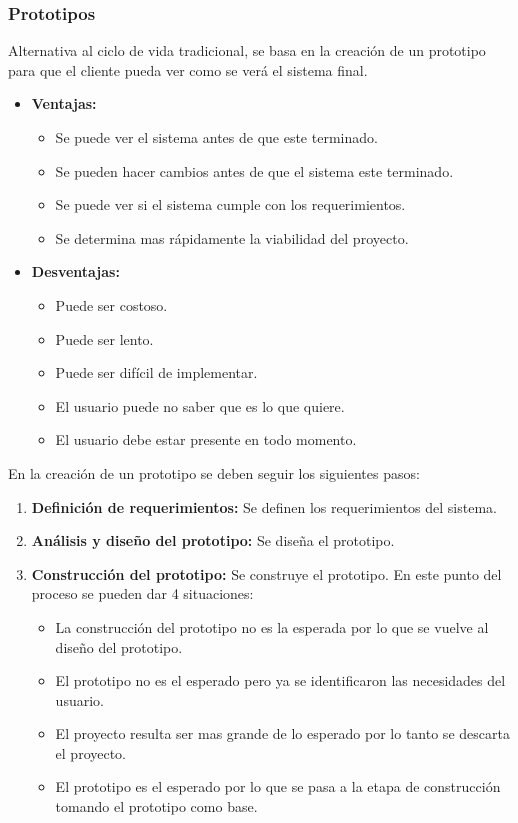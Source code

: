 \documentclass{templateNote}
\begin{document}
\subsubsection{Prototipos}
\noindent Alternativa al ciclo de vida tradicional, se basa en la creación de un prototipo para que el cliente pueda ver como se verá el sistema final.
\begin{itemize}
    \item \textbf{Ventajas:}
    \begin{itemize}
        \item Se puede ver el sistema antes de que este terminado.
        \item Se pueden hacer cambios antes de que el sistema este terminado.
        \item Se puede ver si el sistema cumple con los requerimientos.
        \item Se determina mas rápidamente la viabilidad del proyecto.
    \end{itemize}
    \item \textbf{Desventajas:}
    \begin{itemize}
        \item Puede ser costoso.
        \item Puede ser lento.
        \item Puede ser difícil de implementar.
        \item El usuario puede no saber que es lo que quiere.
        \item El usuario debe estar presente en todo momento.
    \end{itemize}
\end{itemize}
\noindent En la creación de un prototipo se deben seguir los siguientes pasos:
\begin{enumerate}
    \item \textbf{Definición de requerimientos:} Se definen los requerimientos del sistema.
    \item \textbf{Análisis y diseño del prototipo:} Se diseña el prototipo.
    \item \textbf{Construcción del prototipo:} Se construye el prototipo.
    En este punto del proceso se pueden dar 4 situaciones:
    \begin{itemize}
        \item La construcción del prototipo no es la esperada por lo que se vuelve al diseño del prototipo.
        \item El prototipo no es el esperado pero ya se identificaron las necesidades del usuario.
        \item El proyecto resulta ser mas grande de lo esperado por lo tanto se descarta el proyecto.
        \item El prototipo es el esperado por lo que se pasa a la etapa de construcción tomando el prototipo como base.
    \end{itemize}
\end{enumerate}
\end{document}
